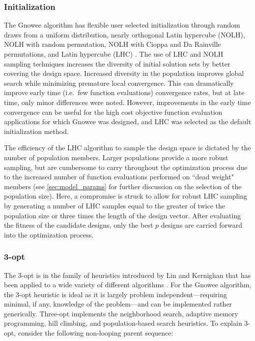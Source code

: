 \documentclass{article}                                                                           %
\begin{document}
\subsubsection{Initialization}
The Gnowee algorithm has flexible user selected initialization through random draws from a uniform distribution, nearly orthogonal Latin hypercube (NOLH), NOLH with random permutation, NOLH with Cioppa and Da Rainville permutations, and Latin hypercube (LHC) \cite{Viana2013, Cioppa2007, Rainville2012}.
The use of LHC and NOLH sampling techniques increases the diversity of initial solution sets by better covering the design space.
Increased diversity in the population improves global search while minimizing premature local convergence.
This can dramatically improve early time (i.e.\ few function evaluations) convergence rates, but at late time, only minor differences were noted.
However, improvements in the early time convergence can be useful for the high cost objective function evaluation applications for which Gnowee was designed, and LHC was selected as the default initialization method.

The efficiency of the LHC algorithm to sample the design space is dictated by the number of population members.
Larger populations provide a more robust sampling, but are cumbersome to carry throughout the optimization process due to the increased number of function evaluations performed on ``dead weight" members (see \autoref{sec:model_params} for further discussion on the selection of the population size).
Here, a compromise is struck to allow for robust LHC sampling by generating a number of LHC samples equal to the greater of twice the population size or three times the length of the design vector.
After evaluating the fitness of the candidate designs, only the best $p$ designs are carried forward into the optimization process. 
 
\subsubsection{3-opt}
The 3-opt is in the family of heuristics introduced by Lin and Kernighan that has been applied to a wide variety of different algorithms \cite{Lin1973}.
For the Gnowee algorithm, the 3-opt heuristic is ideal as it is largely problem independent---requiring minimal, if any, knowledge of the problem---and can be implemented rather generically.  
Three-opt implements the neighborhood search, adaptive memory programming, hill climbing, and population-based search heuristics.
To explain 3-opt, consider the following non-looping parent sequence:
\end{document}
